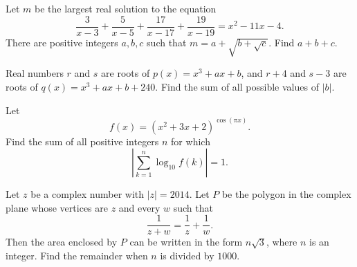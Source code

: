 \begin{question}[name={2014 AIME I, \href{https://artofproblemsolving.com/community/c4p3428788}{Problem 14}}]
	Let $m$ be the largest real solution to the equation\[\frac{3}{x-3}+\frac{5}{x-5}+\frac{17}{x-17}+\frac{19}{x-19}= x^2-11x-4.\]There are positive integers $a,b,c$ such that $m = a + \sqrt{b+\sqrt{c}}$. Find $a+b+c$.
\end{question}


%	












\begin{question}[name={2014 AIME II, \href{https://artofproblemsolving.com/community/c4p3444093}{Problem 5}}]
	Real numbers $r$ and $s$ are roots of $p(x)=x^3+ax+b$, and $r+4$ and $s-3$ are roots of $q(x)=x^3+ax+b+240$. Find the sum of all possible values of $|b|$.
\end{question}


%	











\begin{question}[name={2014 AIME II, \href{https://artofproblemsolving.com/community/c4p3444108}{Problem 7}}]
	Let $$f(x) = (x^2+3x+2)^{\cos(\pi x)}.$$ Find the sum of all positive integers $n$ for which\[\left| \sum_{k=1}^n \log_{10} f(k) \right| = 1.\]
\end{question}


%	













\begin{question}[name={2014 AIME II, \href{https://artofproblemsolving.com/community/c4p3444114}{Problem 10}}]
	Let $z$ be a complex number with $|z| = 2014$. Let $P$ be the polygon in the complex plane whose vertices are $z$ and every $w$ such that $$\frac{1}{z+w} = \frac{1}{z} + \frac{1}{w}.$$ Then the area enclosed by $P$ can be written in the form $n\sqrt{3}$, where $n$ is an integer. Find the remainder when $n$ is divided by $1000$.	
\end{question}


